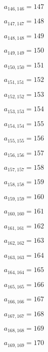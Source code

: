 \documentclass[a4paper,12pt]{article}
\begin{document}
$a _{ 146, 146 } = 147$

$a _{ 147, 147 } = 148$

$a _{ 148, 148 } = 149$

$a _{ 149, 149 } = 150$

$a _{ 150, 150 } = 151$

$a _{ 151, 151 } = 152$

$a _{ 152, 152 } = 153$

$a _{ 153, 153 } = 154$

$a _{ 154, 154 } = 155$

$a _{ 155, 155 } = 156$

$a _{ 156, 156 } = 157$

$a _{ 157, 157 } = 158$

$a _{ 158, 158 } = 159$

$a _{ 159, 159 } = 160$

$a _{ 160, 160 } = 161$

$a _{ 161, 161 } = 162$

$a _{ 162, 162 } = 163$

$a _{ 163, 163 } = 164$

$a _{ 164, 164 } = 165$

$a _{ 165, 165 } = 166$

$a _{ 166, 166 } = 167$

$a _{ 167, 167 } = 168$

$a _{ 168, 168 } = 169$

$a _{ 169, 169 } = 170$
\end{document}
